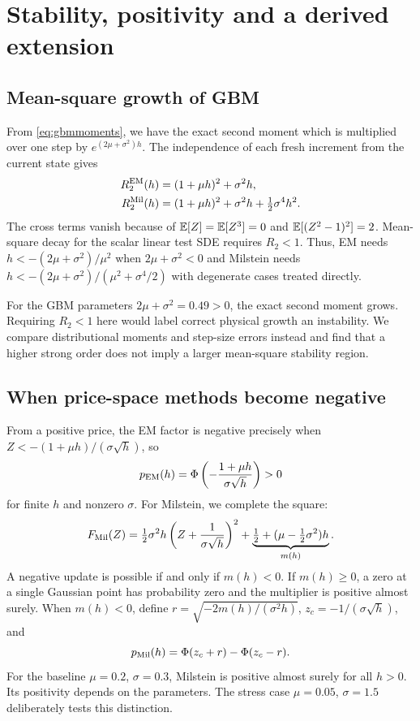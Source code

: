 \section{Stability, positivity and a derived extension}
\label{sec:stability}
\subsection{Mean-square growth of GBM}
From \eqref{eq:gbmmoments}, we have the exact second moment which is multiplied over one step by $e^{(2\mu+\sigma^2)h}$. The independence of each fresh increment from the current state gives
\begin{align}
R_2^{\rm EM}(h)&=(1+\mu h)^2+\sigma^2h,\\
R_2^{\rm Mil}(h)&=(1+\mu h)^2+\sigma^2h+\tfrac12\sigma^4h^2.
\end{align}
The cross terms vanish because of $\mathbb E[Z]=\mathbb E[Z^3]=0$ and $\mathbb E[(Z^2-1)^2]=2$. Mean-square decay for the scalar linear test SDE requires $R_2<1$. Thus, EM needs $h<-(2\mu+\sigma^2)/\mu^2$ when $2\mu+\sigma^2<0$ and Milstein needs $h<-(2\mu+\sigma^2)/(\mu^2+\sigma^4/2)$ with degenerate cases treated directly.

For the GBM parameters $2\mu+\sigma^2=0.49>0$, the exact second moment grows. Requiring $R_2<1$ here would label correct physical growth an instability. We compare distributional moments and step-size errors instead and find that a higher strong order does not imply a larger mean-square stability region.

\subsection{When price-space methods become negative}
From a positive price, the EM factor is negative precisely when $Z<-(1+\mu h)/(\sigma\sqrt h)$, so
\begin{equation}\label{eq:pem}p_{\rm EM}(h)=\Phi\left(-\frac{1+\mu h}{\sigma\sqrt h}\right)>0
\end{equation}
for finite $h$ and nonzero $\sigma$. For Milstein, we complete the square:
\begin{equation}
F_{\rm Mil}(Z)=\tfrac12\sigma^2h\left(Z+\frac1{\sigma\sqrt h}\right)^2+
\underbrace{\tfrac12+(\mu-\tfrac12\sigma^2)h}_{m(h)}.
\end{equation}
A negative update is possible if and only if $m(h)<0$. If $m(h)\ge0$, a zero at a single Gaussian point has probability zero and the multiplier is positive almost surely. When $m(h)<0$, define $r=\sqrt{-2m(h)/(\sigma^2h)}$, $z_c=-1/(\sigma\sqrt h)$, and
\begin{equation}p_{\rm Mil}(h)=\Phi(z_c+r)-\Phi(z_c-r).
\end{equation}
For the baseline $\mu=0.2$, $\sigma=0.3$, Milstein is positive almost surely for all $h>0$. Its positivity depends on the parameters. The stress case $\mu=0.05$, $\sigma=1.5$ deliberately tests this distinction.

